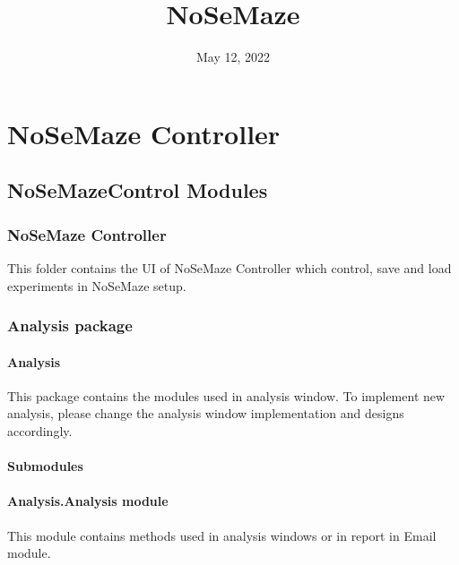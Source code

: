 \documentclass[letterpaper,10pt,english]{sphinxmanual}
\title{NoSeMaze}
\date{May 12, 2022}
\author{}
\begin{document}
\pagestyle{empty}
\sphinxmaketitle
\pagestyle{plain}
\sphinxtableofcontents
\pagestyle{normal}
\label{\detokenize{index::doc}}


\sphinxstepscope


\chapter{NoSeMaze Controller}
\label{\detokenize{NoSeMazeControl:nosemaze-controller}}\label{\detokenize{NoSeMazeControl::doc}}
\sphinxstepscope


\section{NoSeMazeControl Modules}
\label{\detokenize{NoSeMazeControl/modules:nosemazecontrol-modules}}\label{\detokenize{NoSeMazeControl/modules::doc}}

\subsection{NoSeMaze Controller}
\label{\detokenize{NoSeMazeControl/modules:nosemaze-controller}}
\sphinxAtStartPar
This folder contains the UI of NoSeMaze Controller which control, save and load experiments in NoSeMaze setup.

\sphinxstepscope


\subsection{Analysis package}
\label{\detokenize{NoSeMazeControl/Analysis:analysis-package}}\label{\detokenize{NoSeMazeControl/Analysis::doc}}

\subsubsection{Analysis}
\label{\detokenize{NoSeMazeControl/Analysis:analysis}}
\sphinxAtStartPar
This package contains the modules used in analysis window. To implement new analysis, please change the analysis window implementation and designs accordingly.


\subsubsection{Submodules}
\label{\detokenize{NoSeMazeControl/Analysis:submodules}}

\subsubsection{Analysis.Analysis module}
\label{\detokenize{NoSeMazeControl/Analysis:module-Analysis.Analysis}}\label{\detokenize{NoSeMazeControl/Analysis:analysis-analysis-module}}
\sphinxAtStartPar
This module contains methods used in analysis windows or in report in Email
module.
\end{document}
